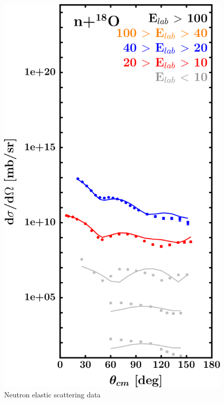 \begin{figure}[H]
\begin{minipage}{0.45\textwidth}
        \includegraphics[width=1.0\textwidth]{figures/o18_neutronElastic.png}
        \caption{Neutron elastic scattering data}
        \label{DOMFitData_o18_neutron_elastic}
    \end{minipage}
\end{figure}

